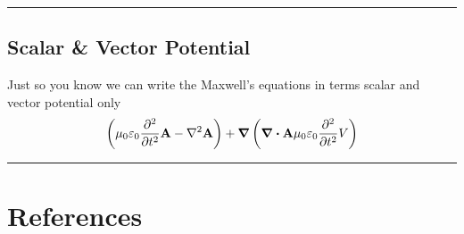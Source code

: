 \documentclass[12pt,english]{article}
\numberwithin{equation}{subsection}
\renewcommand{\vec}[1]{\mathbf{#1}}
\begin{document}
\par\noindent\rule{\textwidth}{0.4pt}
\subsection{Scalar \& Vector Potential}
Just so you know we can write the Maxwell's equations in terms scalar and vector potential only
\begin{equation}
    \left( \mu_0 \varepsilon_0 \pdv[2]{}{t}\vec{A} - \laplacian \vec{A}   \right) + \grad \left( \div \vec{A} \mu_0 \varepsilon_0 \pdv[2]{}{t} V \right)
\end{equation}
\par\noindent\rule{\textwidth}{0.4pt}

































































\newpage
\section*{References}
%
\printbibliography
[heading = none]

\end{document}
